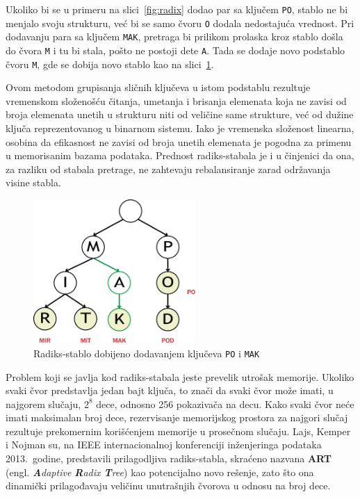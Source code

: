 \documentclass[12pt,oneside]{memoir}
\begin{document}
Ukoliko bi se u primeru na
slici~\ref{fig:radix} dodao par sa ključem \texttt{PO},
stablo ne bi menjalo svoju strukturu, već
bi se samo čvoru \texttt{O} dodala nedostajuća vrednost.
Pri dodavanju para sa ključem \texttt{MAK}, pretraga bi prilikom prolaska
kroz stablo došla do čvora \texttt{M} i tu bi stala,
pošto ne postoji dete \texttt{A}. Tada se dodaje novo podstablo
čvoru \texttt{M}, gde se dobija novo stablo kao na slici~\ref{fig:radix2}.


Ovom metodom grupisanja sličnih ključeva u
istom podstablu rezultuje vremenskom složenošću čitanja, umetanja i brisanja
elemenata koja ne zavisi od broja elemenata
unetih u strukturu niti od veličine same strukture, već od
dužine ključa reprezentovanog u binarnom sistemu. Iako je vremenska složenost linearna,
osobina da efikasnost ne zavisi od broja unetih elemenata je pogodna za primenu
u memorisanim bazama podataka. Prednost radiks-stabala je i u činjenici da ona,
za razliku od stabala pretrage, ne zahtevaju rebalansiranje zarad
održavanja visine stabla.

\begin{figure}[!h]
  \centering
  \includegraphics[width=0.55\textwidth]{radix_tree_2.eps}
  \caption{Radiks-stablo dobijeno dodavanjem ključeva \texttt{PO} i \texttt{MAK}}
  \label{fig:radix2}
\end{figure}

Problem koji se javlja kod radiks-stabala jeste prevelik utrošak memorije.
Ukoliko svaki čvor predstavlja jedan bajt ključa, to znači da
svaki čvor može imati, u najgorem slučaju, $ 2^{8} $ dece,
odnosno 256 pokazivača na decu.
Kako svaki čvor neće imati maksimalan broj dece, rezervisanje memorijskog prostora
za najgori slučaj rezultuje prekomernim korišćenjem memorije u prosečnom slučaju.
Lajs, Kemper i Nojman su, na IEEE internacionalnoj konferenciji inženjeringa
podataka 2013.\ godine, predstavili prilagodljiva radiks-stabla,
skraćeno nazvana \textbf{ART}~\cite{artful}
(engl. \emph{\textbf{A}daptive \textbf{R}adix \textbf{T}ree})
kao potencijalno novo rešenje, zato što ona dinamički
prilagođavaju veličinu unutrašnjih čvorova u odnosu na broj dece.
\end{document}
